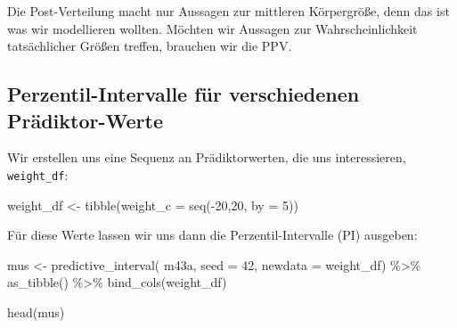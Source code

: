 \documentclass[
  a4paper,
  DIV=11]{scrreprt}
\newenvironment{Shaded}{\begin{snugshade}}{\end{snugshade}}
\newcommand{\AttributeTok}[1]{\textcolor[rgb]{0.40,0.45,0.13}{#1}}
\newcommand{\DecValTok}[1]{\textcolor[rgb]{0.68,0.00,0.00}{#1}}
\newcommand{\FunctionTok}[1]{\textcolor[rgb]{0.28,0.35,0.67}{#1}}
\newcommand{\NormalTok}[1]{\textcolor[rgb]{0.00,0.23,0.31}{#1}}
\newcommand{\OtherTok}[1]{\textcolor[rgb]{0.00,0.23,0.31}{#1}}
\newcommand{\SpecialCharTok}[1]{\textcolor[rgb]{0.37,0.37,0.37}{#1}}
\theoremstyle{definition}
\theoremstyle{remark}
\begin{document}
\begin{tcolorbox}[enhanced jigsaw, leftrule=.75mm, left=2mm, bottomrule=.15mm, opacityback=0, coltitle=black, colbacktitle=quarto-callout-important-color!10!white, opacitybacktitle=0.6, rightrule=.15mm, toptitle=1mm, colback=white, colframe=quarto-callout-important-color-frame, arc=.35mm, toprule=.15mm, breakable, titlerule=0mm, bottomtitle=1mm, title=\textcolor{quarto-callout-important-color}{\faExclamation}\hspace{0.5em}{Wichtig}]
Die Post-Verteilung macht nur Aussagen zur mittleren Körpergröße, denn
das ist was wir modellieren wollten. Möchten wir Aussagen zur
Wahrscheinlichkeit tatsächlicher Größen treffen, brauchen wir die PPV.
\end{tcolorbox}

\hypertarget{perzentil-intervalle-fuxfcr-verschiedenen-pruxe4diktor-werte}{%
\subsection{Perzentil-Intervalle für verschiedenen
Prädiktor-Werte}\label{perzentil-intervalle-fuxfcr-verschiedenen-pruxe4diktor-werte}}

Wir erstellen uns eine Sequenz an Prädiktorwerten, die uns
interessieren, \texttt{weight\_df}:

\begin{Shaded}
\begin{Highlighting}[]
\NormalTok{weight\_df }\OtherTok{\textless{}{-}} \FunctionTok{tibble}\NormalTok{(}\AttributeTok{weight\_c =} \FunctionTok{seq}\NormalTok{(}\SpecialCharTok{{-}}\DecValTok{20}\NormalTok{,}\DecValTok{20}\NormalTok{, }\AttributeTok{by =} \DecValTok{5}\NormalTok{))}
\end{Highlighting}
\end{Shaded}

Für diese Werte lassen wir uns dann die Perzentil-Intervalle (PI)
ausgeben:

\begin{Shaded}
\begin{Highlighting}[]
\NormalTok{mus }\OtherTok{\textless{}{-}} 
  \FunctionTok{predictive\_interval}\NormalTok{(}
\NormalTok{    m43a, }
    \AttributeTok{seed =} \DecValTok{42}\NormalTok{,}
    \AttributeTok{newdata =}\NormalTok{ weight\_df) }\SpecialCharTok{\%\textgreater{}\%} 
  \FunctionTok{as\_tibble}\NormalTok{() }\SpecialCharTok{\%\textgreater{}\%} 
  \FunctionTok{bind\_cols}\NormalTok{(weight\_df)}

\FunctionTok{head}\NormalTok{(mus)}
\end{Highlighting}
\end{Shaded}
\end{document}
